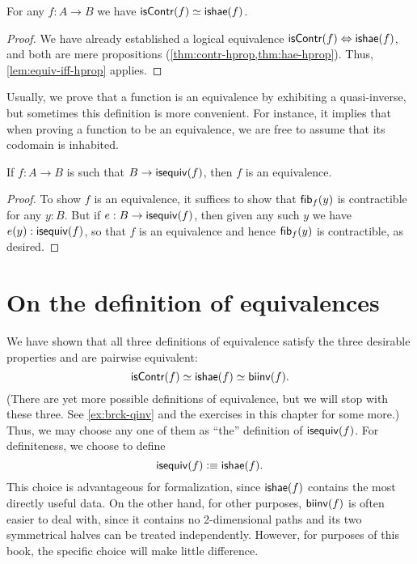 \begin{thm}\label{thm:equiv-contr-hae}
  For any $f:A\to B$ we have $\mathsf{isContr}(f) \simeq \mathsf{ishae}(f)$.
\end{thm}
\begin{proof}
  We have already established a logical equivalence ${\mathsf{isContr}(f)} \Leftrightarrow {\ensuremath{\mathsf{ishae}}(f)}$, and both are mere propositions (\cref{thm:contr-hprop,thm:hae-hprop}).
  Thus, \autoref{lem:equiv-iff-hprop} applies.
\end{proof}

Usually, we prove that a function is an equivalence by exhibiting a quasi-inverse, but sometimes this definition is more convenient.
For instance, it implies that when proving a function to be an equivalence, we are free to assume that its codomain is inhabited.

\begin{cor}\label{thm:equiv-inhabcod}
  If $f:A\to B$ is such that $B\to \mathsf{isequiv}(f)$, then $f$ is an equivalence.
\end{cor}
\begin{proof}
  To show $f$ is an equivalence, it suffices to show that ${\mathsf{fib}}_{f}(y)$ is contractible for any $y:B$.
  But if $e:B\to \mathsf{isequiv}(f)$, then given any such $y$ we have $e(y):\mathsf{isequiv}(f)$, so that $f$ is an equivalence and hence ${\mathsf{fib}}_{f}(y)$ is contractible, as desired.
\end{proof}

%
%
%

\section{On the definition of equivalences}
\label{sec:concluding-remarks}

We have shown that all three definitions of equivalence satisfy the three desirable properties and are pairwise equivalent:
\[ \mathsf{isContr}(f) \simeq \mathsf{ishae}(f) \simeq \mathsf{biinv}(f) . \]
(There are yet more possible definitions of equivalence, but we will stop with these three.
See \autoref{ex:brck-qinv} and the exercises in this chapter for some more.)
Thus, we may choose any one of them as ``the'' definition of $\mathsf{isequiv} (f)$.
For definiteness, we choose to define
\[ \mathsf{isequiv}(f) \vcentcolon\equiv \mathsf{ishae}(f).\]
%
This choice is advantageous for formalization, since $\mathsf{ishae}(f)$ contains the most directly useful data.
On the other hand, for other purposes, $\mathsf{biinv}(f)$ is often easier to deal with, since it contains no 2-dimensional paths and its two symmetrical halves can be treated independently.
However, for purposes of this book, the specific choice will make little difference.


